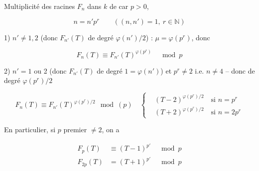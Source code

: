 
Multiplicité \inserted{$\mu$} des racines  $F_n$  dans $k$ de car $p>0$,

\[
n=n'p^r\qquad((n,n')=1,\ r\in\mathbb N)
\]

1) $n'\ne1,2$ (donc $F_{n'}(T)$ de degré $\varphi(n')/2$) : $\mu=\varphi(p^r)$, donc

\[
F_n(T)\equiv F_{n'}(T)^{\varphi(p^r)}\quad\bmod p
\]

2) $n'=1$ ou 2 (donc $F_{n'}(T)$ de degré $1=\varphi(n')$)  et $p^r\ne2$ i.e. $n\ne4$ -- donc   de degré $\varphi(p^r)/2$


\[
F_n(T)\equiv F_{n'}(T)^{\varphi(p^r)/2}\ \bmod(p)\quad
\left\{\begin{aligned}
&(T-2)^{\varphi(p^r)/2}\quad\text{si }n=p^r\\
&(T+2)^{\varphi(p^r)/2}\quad\text{si }n=2p^r
\end{aligned}\right.
\]



En particulier, si $p$ premier $\ne2$, on a

\[
\begin{aligned}
F_p(T)&\equiv(T-1)^{p'}\quad\bmod p\\
F_{2p}(T)&=(T+1)^{p'}\quad\bmod p
\end{aligned}
\]


